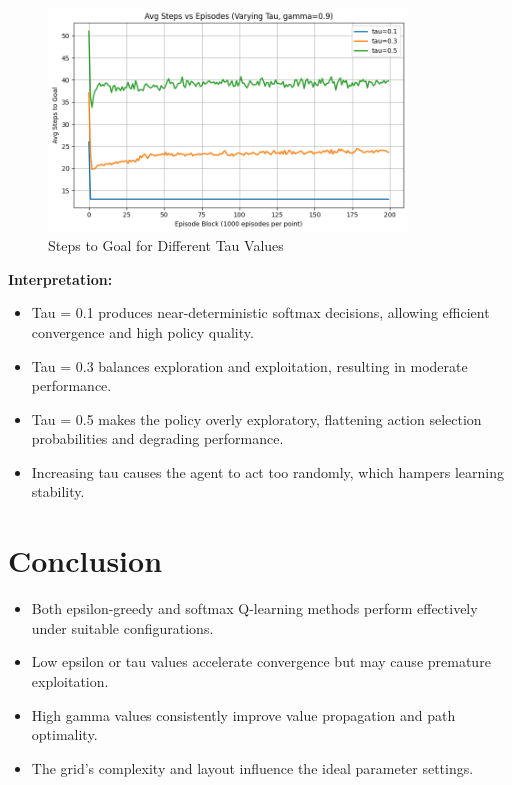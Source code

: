 \documentclass[12pt]{article}
\begin{document}
\begin{figure}[H]
  \centering
  \includegraphics[width=0.85\textwidth]{images/part2_q3_steps_vs_tau.png}
  \caption{Steps to Goal for Different Tau Values}
\end{figure}

\textbf{Interpretation:}
\begin{itemize}
  \item Tau = 0.1 produces near-deterministic softmax decisions, allowing efficient convergence and high policy quality.
  \item Tau = 0.3 balances exploration and exploitation, resulting in moderate performance.
  \item Tau = 0.5 makes the policy overly exploratory, flattening action selection probabilities and degrading performance.
  \item Increasing tau causes the agent to act too randomly, which hampers learning stability.
\end{itemize}

\section{Conclusion}
\begin{itemize}
  \item Both epsilon-greedy and softmax Q-learning methods perform effectively under suitable configurations.
  \item Low epsilon or tau values accelerate convergence but may cause premature exploitation.
  \item High gamma values consistently improve value propagation and path optimality.
  \item The grid's complexity and layout influence the ideal parameter settings.
\end{itemize}
\end{document}
